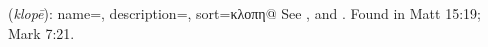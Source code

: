 \item[Stealing (act of),]

(\textit{klopē}):
{
    name=,
    description={},
    sort=κλοπη@
}
See , and .
Found in Matt 15:19; Mark 7:21.
